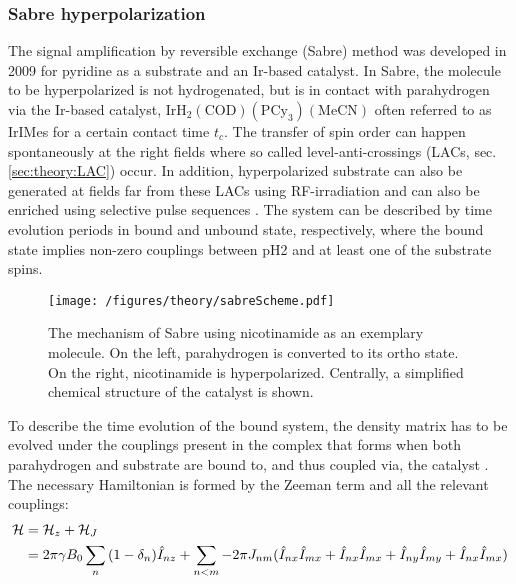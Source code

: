         \subsubsection{Sabre hyperpolarization}
        \label{sec:theory:HPSabre}
        The signal amplification by reversible exchange (Sabre) method was developed in 2009 \cite{adams_reversible_2009-2} for pyridine as a substrate and an Ir-based catalyst.
        In Sabre, the molecule to be hyperpolarized is not hydrogenated, but is in contact with parahydrogen via the Ir-based catalyst, $\mathrm{IrH_2(COD)(PCy_3)(MeCN)}$ often referred to as IrIMes for a certain contact time $t_c$. The transfer of spin order can happen spontaneously at the right fields \cite{atkinson_spontaneous_2009-1} where so called level-anti-crossings (LACs, sec. \ref{sec:theory:LAC}) occur. In addition, hyperpolarized substrate can also be generated at fields far from these LACs using RF-irradiation \cite{pravdivtsev_spin_2014, knecht_quantitative_2019} and can also be enriched using selective pulse sequences \cite{knecht_re-polarization_2018-1}. The system can be described by time evolution periods in bound and unbound state, respectively, where the bound state implies non-zero couplings between pH2 and at least one of the substrate spins.
            \begin{figure}
                \centering
                \texttt{[image: /figures/theory/sabreScheme.pdf]}
                \caption[Sabre scheme]{The mechanism of Sabre using nicotinamide as an exemplary molecule. On the left, parahydrogen is converted to its ortho state. On the right, nicotinamide is hyperpolarized. Centrally, a simplified chemical structure of the catalyst is shown.}
            \end{figure}
            To describe the time evolution of the bound system, the density matrix has to be evolved under the couplings present in the complex that forms when both parahydrogen and substrate are bound to, and thus coupled via, the catalyst \cite{cowley_iridium_2011-1}. The necessary Hamiltonian is formed by the Zeeman term and all the relevant couplings:
            \begin{equation}
                \begin{aligned}
                    \mathcal{H}& = \mathcal{H}_z + \mathcal{H}_J \\
                        & =\-2\pi\gamma B_0 \sum_n{(1-\delta_n)\hat{I}_{nz}} + \sum_{n<m} -2\pi J_{nm}(\hat{I}_{nx}\hat{I}_{mx} + \hat{I}_{nx}\hat{I}_{mx}+ \hat{I}_{ny}\hat{I}_{my} + \hat{I}_{nx}\hat{I}_{mx})
                \end{aligned}
            \end{equation}
